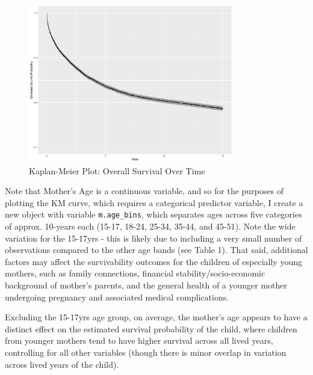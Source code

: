 \documentclass[12pt,letterpaper]{article}
\begin{document}



\begin{figure}[!htpb]
	\centering
	\includegraphics[width=0.8\textwidth]{overall.pdf}
	\caption{Kaplan-Meier Plot: Overall Survival Over Time}
	\label{fig:overall}
\end{figure}

\vspace{.25cm}
\noindent Note that Mother's Age is a continuous variable, and so for the purposes of plotting the KM curve, which requires a categorical predictor variable, I create a new object with variable \texttt{m.age\_bins}, which separates ages across five categories of approx. 10-years each (15-17, 18-24, 25-34, 35-44, and 45-51). Note the wide variation for the 15-17yrs - this is likely due to including a very small number of observations compared to the other age bands (see Table 1). That said, additional factors may affect the survivability outcomes for the children of especially young mothers, such as family connections, financial stability/socio-economic background of mother's parents, and the general health of a younger mother undergoing pregnancy and associated medical complications.



\vspace{.25cm}

\noindent Excluding the 15-17yrs age group, on average, the mother's age appears to have a distinct effect on the estimated survival probability of the child, where children from younger mothers tend to have higher survival across all lived years, controlling for all other variables (though there is minor overlap in variation across lived years of the child).
\end{document}

